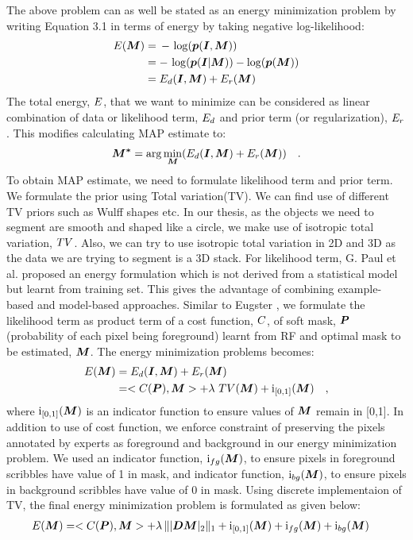 The above problem can as well be stated as an energy minimization problem by
writing Equation 3.1 in terms of energy by taking negative log-likelihood:
\begin{align*}
\mathop{{}E}(\boldsymbol{M}) &=\, - \, \log(\boldsymbol{p}(\boldsymbol{I}, \boldsymbol{M})) \\
&= -\, \log(\boldsymbol{p}(\boldsymbol{I}|\boldsymbol{M})) - \log(\boldsymbol{p}(\boldsymbol{M})) \\
&= \mathop{{}E_d}(\boldsymbol{I}, \boldsymbol{M}) + \mathop{{}E_r} (\boldsymbol{M})
\end{align*}
The total energy, $\mathop{{}E}$, that we want to minimize can be considered as linear combination of data or likelihood term, $\mathop{{}E_d}$ and prior term (or regularization), $\mathop{{}E_r}$. This modifies calculating MAP estimate to:
\begin{equation*}
\boldsymbol{M^*} = \arg\min_{\boldsymbol{M}}({\mathop{{}E_d}(\boldsymbol{I}, \boldsymbol{M}) + \mathop{{}E_r} (\boldsymbol{M})}) \quad .
\end{equation*}
To obtain MAP estimate, we need to formulate likelihood term and prior term. We formulate the prior using Total variation(TV). We can find use of different TV priors such as Wulff shapes etc. In our thesis, as the objects we need to segment are smooth and shaped like a circle, we make use of isotropic total variation, $\mathop{{}TV}$. Also, we can try to use isotropic total variation in 2D and 3D as the data we are trying to segment is a 3D stack. For likelihood term, G. Paul et al.\cite{Paul2013} proposed an energy formulation which is not derived from a statistical model but learnt from training set. This gives the advantage of combining example-based and model-based approaches. Similar to Eugster \cite{dominic}, we formulate the likelihood term as product term of a cost function, $\mathop{{}C}$, of soft mask, $\boldsymbol{P}$(probability of each pixel being foreground) learnt from RF and optimal mask to be estimated, $\boldsymbol{M}$. The energy minimization problems becomes:
\begin{align*}
\mathop{{}E}(\boldsymbol{M}) &= \mathop{{}E_d}(\boldsymbol{I}, \boldsymbol{M}) + \mathop{{}E_r} (\boldsymbol{M}) \\
&= <\mathop{{}C}(\boldsymbol{P}), \boldsymbol{M}> + \lambda\, \mathop{{}TV}(\boldsymbol{M}) + \mathrm{i}_{[0,1]}(\boldsymbol{M}) \quad , 
\end{align*}
where $\mathrm{i}_{[0,1]}(\boldsymbol{M})$ is an indicator function to ensure values of $\boldsymbol{M}$ remain in [0,1]. In addition to use of cost function, we enforce constraint of preserving the pixels annotated by experts as foreground and background in our energy minimization problem. We used an indicator function, $\mathrm{i}_{fg}(\boldsymbol{M})$, to ensure pixels in foreground scribbles have value of 1 in mask, and indicator function, $\mathrm{i}_{bg}(\boldsymbol{M})$, to ensure pixels in background scribbles have value of 0 in mask. Using discrete implementaion of TV, the final energy minimization problem is formulated as given below:
\begin{align*}
\mathop{{}E}(\boldsymbol{M}) &= <\mathop{{}C}(\boldsymbol{P}), \boldsymbol{M}> + \lambda\, \||\boldsymbol{D}\boldsymbol{M}|_2\|_1 + \mathrm{i}_{[0,1]}(\boldsymbol{M}) + \mathrm{i}_{fg}(\boldsymbol{M})  + \mathrm{i}_{bg}(\boldsymbol{M}) 
\end{align*}

